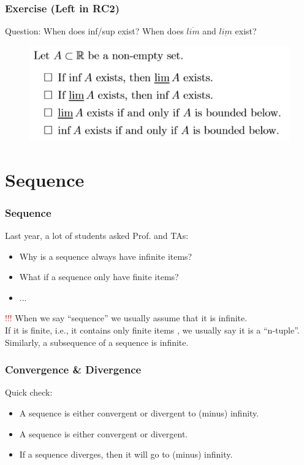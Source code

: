 \documentclass{beamer}
\begin{document}
\begin{frame}
    \frametitle{Exercise (Left in RC2)}
    Question: When does inf/sup exist? When does $\overline{lim}$ and $\underline{lim}$ exist?
    \begin{figure}[htbp]
        \centering
        \includegraphics[width=12cm]{extra.png}
    \end{figure}
\end{frame}

\section{Sequence}
\begin{frame}
    \frametitle{Sequence}
    Last year, a lot of students asked Prof. and TAs:
    \begin{itemize}
        \item Why is a sequence always have infinite items?
        \item What if a sequence only have finite items?
        \item ...
    \end{itemize}

    \textcolor{red}{!!!}
    When we say “sequence” we usually assume that it is infinite.\\
    If it is finite, i.e., it contains only finite items
    , we usually say it is a “n-tuple”.
    Similarly, a subsequence of a sequence is infinite.

\end{frame}
\begin{frame}
    \frametitle{Convergence \& Divergence}
    \begin{block}{Quick check:}
        \hspace{1em}
        \begin{itemize}
            \item A sequence is either convergent or divergent to (minus) infinity.
            \item A sequence is either convergent or divergent.
            \item If a sequence diverges, then it will go to (minus) infinity.
        \end{itemize}
    \end{block}
\end{frame}
\end{document}
